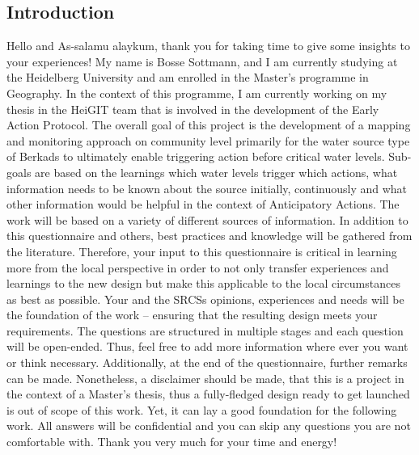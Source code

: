 \subsection*{Introduction}
Hello and As-salamu alaykum,\newline
thank you for taking time to give some insights to your experiences!\newline
My name is Bosse Sottmann, and I am currently studying at the Heidelberg University and am enrolled in the Master's programme in Geography. In the context of this programme, I am currently working on my thesis in the HeiGIT team that is involved in the development of the Early Action Protocol.\newline
The overall goal of this project is the development of a mapping and monitoring approach on community level primarily for the water source type of Berkads to ultimately enable triggering action before critical water levels. Sub-goals are based on the learnings which water levels trigger which actions, what information needs to be known about the source initially, continuously and what other information would be helpful in the context of Anticipatory Actions.\newline
The work will be based on a variety of different sources of information. In addition to this questionnaire and others, best practices and knowledge will be gathered from the literature. Therefore, your input to this questionnaire is critical in learning more from the local perspective in order to not only transfer experiences and learnings to the new design but make this applicable to the local circumstances as best as possible. Your and the SRCSs opinions, experiences and needs will be the foundation of the work – ensuring that the resulting design meets your requirements.\newline
The questions are structured in multiple stages and each question will be open-ended. Thus, feel free to add more information where ever you want or think necessary. Additionally, at the end of the questionnaire, further remarks can be made.\newline
Nonetheless, a disclaimer should be made, that this is a project in the context of a Master's thesis, thus a fully-fledged design ready to get launched is out of scope of this work. Yet, it can lay a good foundation for the following work.\newline
All answers will be confidential and you can skip any questions you are not comfortable with.\newline
Thank you very much for your time and energy!


